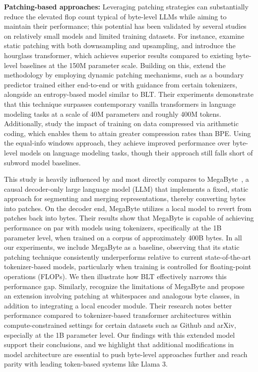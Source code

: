 \textbf{Patching-based approaches:} Leveraging patching strategies can substantially reduce the elevated flop count typical of byte-level LLMs while aiming to maintain their performance; this potential has been validated by several studies on relatively small models and limited training datasets. For instance, \cite{nawrot-etal-2022-hierarchical} examine static patching with both downsampling and upsampling, and introduce the hourglass transformer, which achieves superior results compared to existing byte-level baselines at the 150M parameter scale. Building on this, \cite{nawrot-etal-2023-efficient} extend the methodology by employing dynamic patching mechanisms, such as a boundary predictor trained either end-to-end or with guidance from certain tokenizers, alongside an entropy-based model similar to {\textsc BLT}. Their experiments demonstrate that this technique surpasses contemporary vanilla transformers in language modeling tasks at a scale of 40M parameters and roughly 400M tokens. Additionally, \cite{lester2024training} study the impact of training on data compressed via arithmetic coding, which enables them to attain greater compression rates than BPE. Using the equal-info windows approach, they achieve improved performance over byte-level models on language modeling tasks, though their approach still falls short of subword model baselines.

This study is heavily influenced by and most directly compares to MegaByte~\citep{yu2023megabyte}, a causal decoder-only large language model (LLM) that implements a fixed, static approach for segmenting and merging representations, thereby converting bytes into patches. On the decoder end, MegaByte utilizes a local model to revert from patches back into bytes. Their results show that MegaByte is capable of achieving performance on par with models using tokenizers, specifically at the 1B parameter level, when trained on a corpus of approximately 400B bytes. In all our experiments, we include MegaByte as a baseline, observing that its static patching technique consistently underperforms relative to current state-of-the-art tokenizer-based models, particularly when training is controlled for floating-point operations (FLOPs). We then illustrate how {\textsc BLT} effectively narrows this performance gap. Similarly, \cite{slagle2024spacebyte} recognize the limitations of MegaByte and propose an extension involving patching at whitespaces and analogous byte classes, in addition to integrating a local encoder module. Their research notes better performance compared to tokenizer-based transformer architectures within compute-constrained settings for certain datasets such as Github and arXiv, especially at the 1B parameter level. Our findings with this extended model support their conclusions, and we highlight that additional modifications in model architecture are essential to push byte-level approaches further and reach parity with leading token-based systems like Llama 3.


